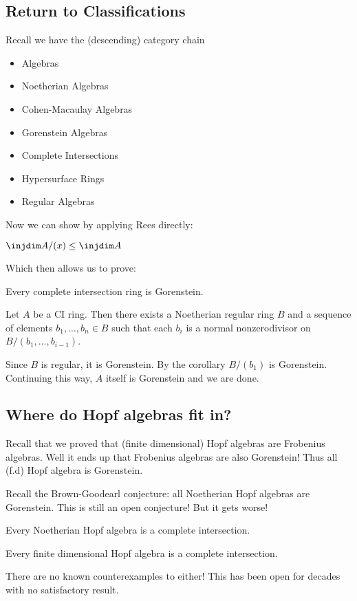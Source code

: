 \documentclass[12pt]{article}
\begin{document}
\subsection{Return to Classifications}
Recall we have the (descending) category chain
\begin{itemize}
	\item Algebras
	\item Noetherian Algebras
	\item Cohen-Macaulay Algebras
	\item Gorenstein Algebras
	\item Complete Intersections
	\item Hypersurface Rings
	\item Regular Algebras
\end{itemize}
Now we can show by applying Rees directly:
\begin{cor}
	$\injdim A/(x)\le \injdim A$
\end{cor}
Which then allows us to prove:
\begin{cor}
	Every complete intersection ring is Gorenstein.
\end{cor}
\begin{prf}
	Let $A$ be a CI ring. Then there exists a Noetherian regular ring $B$ and a sequence of elements $b_1,\dots, b_n\in B$ 
	such that each $b_i$ is a normal nonzerodivisor on $B/(b_1,\dots,b_{i-1})$.

	Since $B$ is regular, it is Gorenstein. By the corollary $B/(b_1)$ is Gorenstein. Continuing this way, $A$
	itself is Gorenstein and we are done. 
\end{prf}

\subsection{Where do Hopf algebras fit in?}
Recall that we proved that (finite dimensional) Hopf algebras are Frobenius algebras. Well it ends up
that Frobenius algebras are also Gorenstein! Thus all (f.d) Hopf algebra is Gorenstein.

Recall the Brown-Goodearl conjecture: all Noetherian Hopf algebras are Gorenstein. This is still an open conjecture!
But it gets worse!
\begin{conj}
	Every Noetherian Hopf algebra is a complete intersection.
\end{conj}
\begin{conj}
	Every finite dimensional Hopf algebra is a complete intersection.
\end{conj}
There are no known counterexamples to either! This has been open for decades with no satisfactory result.
\end{document}
